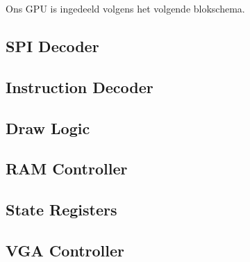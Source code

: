 

Ons GPU is ingedeeld volgens het volgende  blokschema.

\subsection{SPI Decoder}

\subsection{Instruction Decoder}

\subsection{Draw Logic}

\subsection{RAM Controller}

\subsection{State Registers}

\subsection{VGA Controller}

